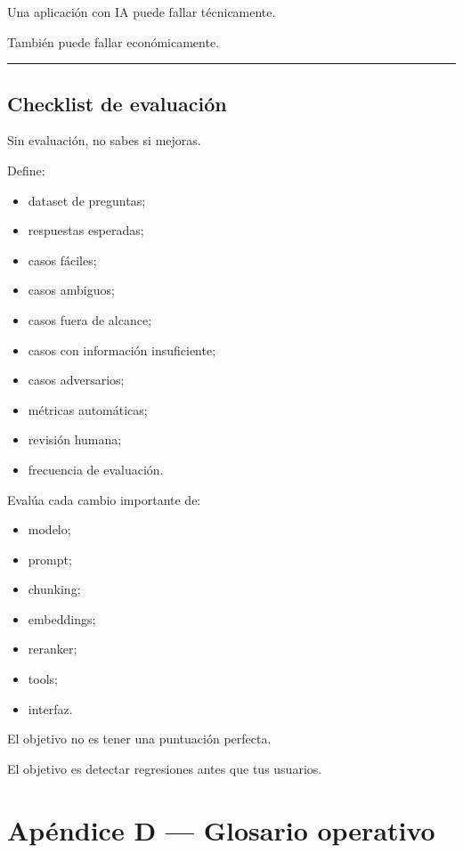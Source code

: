 Una aplicación con IA puede fallar técnicamente.

También puede fallar económicamente.

\begin{center}\rule{0.5\linewidth}{0.5pt}\end{center}

\section{Checklist de evaluación}\label{checklist-de-evaluaciuxf3n}

Sin evaluación, no sabes si mejoras.

Define:

\begin{itemize}
\tightlist
\item
  dataset de preguntas;
\item
  respuestas esperadas;
\item
  casos fáciles;
\item
  casos ambiguos;
\item
  casos fuera de alcance;
\item
  casos con información insuficiente;
\item
  casos adversarios;
\item
  métricas automáticas;
\item
  revisión humana;
\item
  frecuencia de evaluación.
\end{itemize}

Evalúa cada cambio importante de:

\begin{itemize}
\tightlist
\item
  modelo;
\item
  prompt;
\item
  chunking;
\item
  embeddings;
\item
  reranker;
\item
  tools;
\item
  interfaz.
\end{itemize}

El objetivo no es tener una puntuación perfecta.

El objetivo es detectar regresiones antes que tus usuarios.

\newpage

\chapter{Apéndice D --- Glosario
operativo}\label{apuxe9ndice-d-glosario-operativo}


